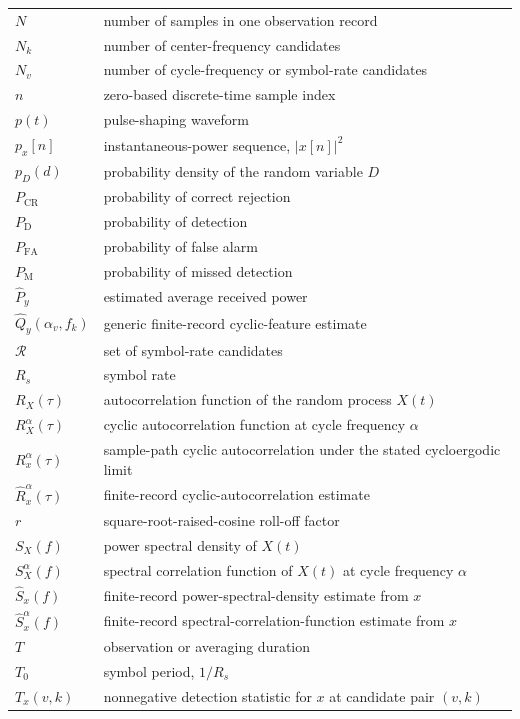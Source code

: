\begin{longtable}{@{}L{0.23\textwidth}L{0.68\textwidth}@{}}
$N$ & number of samples in one observation record \\
$N_k$ & number of center-frequency candidates \\
$N_v$ & number of cycle-frequency or symbol-rate candidates \\
$n$ & zero-based discrete-time sample index \\
$p(t)$ & pulse-shaping waveform \\
$p_x[n]$ & instantaneous-power sequence, $|x[n]|^2$ \\
$p_D(d)$ & probability density of the random variable $D$ \\
$P_{\mathrm{CR}}$ & probability of correct rejection \\
$P_{\mathrm{D}}$ & probability of detection \\
$P_{\mathrm{FA}}$ & probability of false alarm \\
$P_{\mathrm{M}}$ & probability of missed detection \\
$\widehat{P}_y$ & estimated average received power \\
$\widehat{Q}_y(\alpha_v,f_k)$ & generic finite-record cyclic-feature estimate \\
$\mathcal{R}$ & set of symbol-rate candidates \\
$R_s$ & symbol rate \\
$R_X(\tau)$ & autocorrelation function of the random process $X(t)$ \\
$R_X^{\alpha}(\tau)$ & cyclic autocorrelation function at cycle frequency $\alpha$ \\
$R_x^{\alpha}(\tau)$ & sample-path cyclic autocorrelation under the stated cycloergodic limit \\
$\widehat{R}_x^{\alpha}(\tau)$ & finite-record cyclic-autocorrelation estimate \\
$r$ & square-root-raised-cosine roll-off factor \\
$S_X(f)$ & power spectral density of $X(t)$ \\
$S_X^{\alpha}(f)$ & spectral correlation function of $X(t)$ at cycle frequency $\alpha$ \\
$\widehat{S}_x(f)$ & finite-record power-spectral-density estimate from $x$ \\
$\widehat{S}_x^{\alpha}(f)$ & finite-record spectral-correlation-function estimate from $x$ \\
$T$ & observation or averaging duration \\
$T_0$ & symbol period, $1/R_s$ \\
$T_x(v,k)$ & nonnegative detection statistic for $x$ at candidate pair $(v,k)$ \\

\end{longtable}
